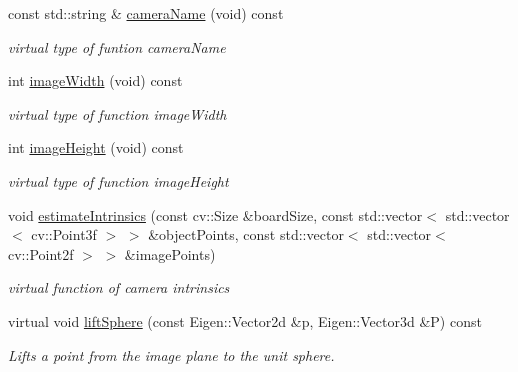 \begin{DoxyCompactItemize}
\mbox{\label{classcamodocal_1_1PinholeCamera_a7ae231baab11bf3d6567333e524743ac}} 
const std\+::string \& \hyperlink{classcamodocal_1_1PinholeCamera_a7ae231baab11bf3d6567333e524743ac}{camera\+Name} (void) const
\begin{DoxyCompactList}\small\item\em virtual type of funtion camera\+Name \end{DoxyCompactList}\item 
\mbox{\label{classcamodocal_1_1PinholeCamera_ae7db15be608e87b2445ed9fff6c0d9f7}} 
int \hyperlink{classcamodocal_1_1PinholeCamera_ae7db15be608e87b2445ed9fff6c0d9f7}{image\+Width} (void) const
\begin{DoxyCompactList}\small\item\em virtual type of function image\+Width \end{DoxyCompactList}\item 
\mbox{\label{classcamodocal_1_1PinholeCamera_a4a4df33440bc1c8b013523b8b289ac2d}} 
int \hyperlink{classcamodocal_1_1PinholeCamera_a4a4df33440bc1c8b013523b8b289ac2d}{image\+Height} (void) const
\begin{DoxyCompactList}\small\item\em virtual type of function image\+Height \end{DoxyCompactList}\item 
\mbox{\label{classcamodocal_1_1PinholeCamera_a09e4a9f75bfe47383163f4035047592a}} 
void \hyperlink{classcamodocal_1_1PinholeCamera_a09e4a9f75bfe47383163f4035047592a}{estimate\+Intrinsics} (const cv\+::\+Size \&board\+Size, const std\+::vector$<$ std\+::vector$<$ cv\+::\+Point3f $>$ $>$ \&object\+Points, const std\+::vector$<$ std\+::vector$<$ cv\+::\+Point2f $>$ $>$ \&image\+Points)
\begin{DoxyCompactList}\small\item\em virtual function of camera intrinsics \end{DoxyCompactList}\item 
virtual void \hyperlink{classcamodocal_1_1PinholeCamera_a0a4191ba420ee40355d8eb0f5cf587a7}{lift\+Sphere} (const Eigen\+::\+Vector2d \&p, Eigen\+::\+Vector3d \&P) const
\begin{DoxyCompactList}\small\item\em Lifts a point from the image plane to the unit sphere. \end{DoxyCompactList}\item 

\end{DoxyCompactItemize}
